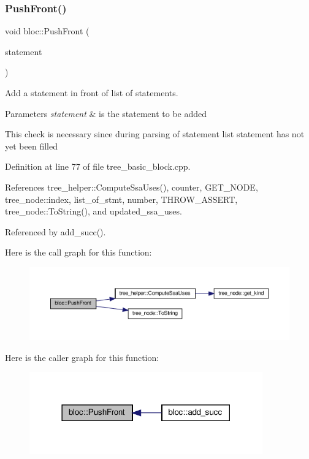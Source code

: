 \subsubsection{\texorpdfstring{Push\+Front()}{PushFront()}}
{\footnotesize\ttfamily void bloc\+::\+Push\+Front (\begin{DoxyParamCaption}\item[{const \hyperlink{tree__node_8hpp_a6ee377554d1c4871ad66a337eaa67fd5}{tree\+\_\+node\+Ref}}]{statement }\end{DoxyParamCaption})}



Add a statement in front of list of statements. 


\begin{DoxyParams}{Parameters}
{\em statement} & is the statement to be added \\
\hline
\end{DoxyParams}
This check is necessary since during parsing of statement list statement has not yet been filled 

Definition at line 77 of file tree\+\_\+basic\+\_\+block.\+cpp.



References tree\+\_\+helper\+::\+Compute\+Ssa\+Uses(), counter, G\+E\+T\+\_\+\+N\+O\+DE, tree\+\_\+node\+::index, list\+\_\+of\+\_\+stmt, number, T\+H\+R\+O\+W\+\_\+\+A\+S\+S\+E\+RT, tree\+\_\+node\+::\+To\+String(), and updated\+\_\+ssa\+\_\+uses.



Referenced by add\+\_\+succ().

Here is the call graph for this function\+:
\nopagebreak
\begin{figure}[H]
\begin{center}
\leavevmode
\includegraphics[width=350pt]{d6/df6/structbloc_ad0a606ca6ec3d5ae878d23925dea6276_cgraph}
\end{center}
\end{figure}
Here is the caller graph for this function\+:
\nopagebreak
\begin{figure}[H]
\begin{center}
\leavevmode
\includegraphics[width=285pt]{d6/df6/structbloc_ad0a606ca6ec3d5ae878d23925dea6276_icgraph}
\end{center}
\end{figure}
\mbox{\label{structbloc_a4ab8511befd9fc1846b99c4bc980c716}} 
